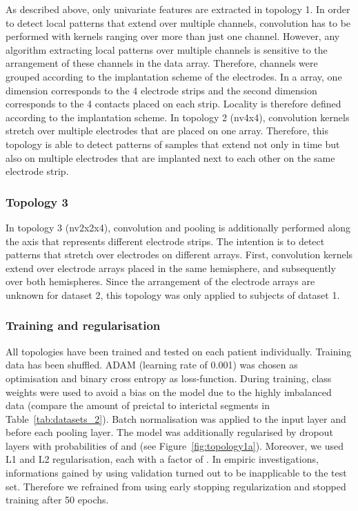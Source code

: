 \documentclass[a4paper, conference]{IEEEtran}
\begin{document}
As described above, only univariate features are extracted in topology 1. In order to detect local patterns that extend over multiple channels, convolution has to be performed with kernels ranging over more than just one channel. However, any algorithm extracting local patterns over multiple channels is sensitive to the arrangement of these channels in the data array. Therefore, channels were grouped according to the implantation scheme of the electrodes. In a  array, one dimension corresponds to the 4 electrode strips and the second dimension corresponds to the 4 contacts placed on each strip. Locality is therefore defined according to the implantation scheme. In topology 2 (nv4x4), convolution kernels stretch over multiple electrodes that are placed on one array. Therefore, this topology is able to detect patterns of samples that extend not only in time but also on multiple electrodes that are implanted next to each other on the same electrode strip. 

\subsubsection*{Topology 3}
In topology 3 (nv2x2x4), convolution and pooling is additionally performed along the axis that represents different electrode strips. The intention is to detect patterns that stretch over electrodes on different arrays. First, convolution kernels extend over electrode arrays placed in the same hemisphere, and subsequently over both hemispheres. Since the arrangement of the electrode arrays are unknown for dataset 2, this topology was only applied to subjects of dataset 1.

\subsubsection*{Training and regularisation}
All topologies have been trained and tested on each patient individually. Training data has been shuffled. ADAM \cite{Kingma2014} (learning rate of 0.001) was chosen as optimisation and binary cross entropy as loss-function. During training, class weights were used to avoid a bias on the model due to the highly imbalanced data (compare the amount of preictal to interictal segments in Table~\ref{tab:datasets_2}).
Batch normalisation \cite{Ioffe2015} was applied to the input layer and before each pooling layer. The model was additionally regularised by dropout layers with probabilities of  and  (see Figure~\ref{fig:topology1a}). Moreover, we used L1 and L2 regularisation, each with a factor of . In empiric investigations, informations gained by using validation turned out to be inapplicable to the test set. Therefore we refrained from using early stopping regularization and stopped training after 50 epochs.
\end{document}
